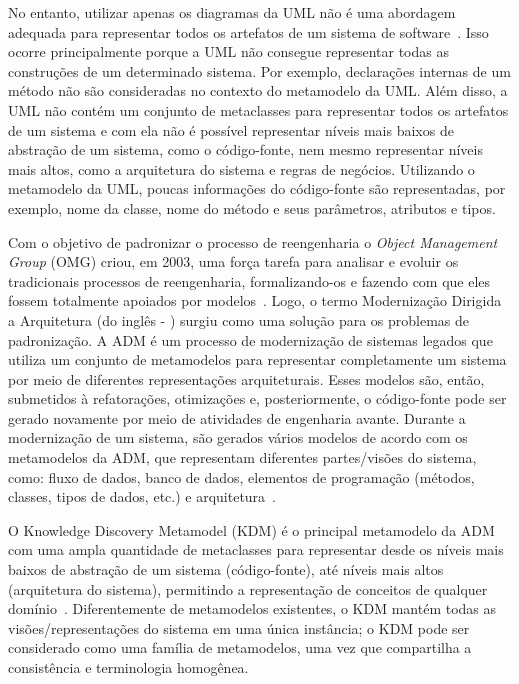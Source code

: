 No entanto, utilizar apenas os diagramas da UML não é uma abordagem adequada para representar todos os artefatos de um sistema de software~\cite{Gorp, KolahdouzRahimi20145, revisao_sistematica_uml_refactoring}. Isso ocorre principalmente porque a UML não consegue representar todas as construções de um determinado sistema. Por exemplo, declarações internas de um método não são consideradas no contexto do metamodelo da UML. Além disso, a UML não contém um conjunto de metaclasses para representar todos os artefatos de um sistema e com ela não é possível representar níveis mais baixos de abstração de um sistema, como o código-fonte, nem mesmo representar níveis mais altos, como a arquitetura do sistema e regras de negócios. Utilizando o metamodelo da UML, poucas informações do código-fonte são representadas, por exemplo, nome da classe, nome do método e seus parâmetros, atributos e tipos.  

Com o objetivo de padronizar o processo de reengenharia o \textit{Object Management Group} (OMG) criou, em 2003, uma força tarefa para analisar e evoluir os tradicionais processos de reengenharia, formalizando-os e fazendo com que eles fossem totalmente apoiados por modelos~\cite{ADM:OMG}. Logo, o termo Modernização Dirigida a Arquitetura (do inglês - ) surgiu como uma solução para os problemas de padronização. A ADM é um processo de modernização de sistemas legados que utiliza um conjunto de metamodelos para representar completamente um sistema por meio de diferentes representações arquiteturais. Esses modelos são, então, submetidos à refatorações, otimizações e, posteriormente, o código-fonte pode ser gerado novamente por meio de atividades de engenharia avante. Durante a modernização de um sistema, são gerados vários modelos de acordo com os metamodelos da ADM, que representam diferentes partes/visões do sistema, como: fluxo de dados, banco de dados, elementos de programação (métodos, classes, tipos de dados, etc.) e arquitetura~\cite{PerezCastillo20121370}.

O Knowledge Discovery Metamodel (KDM) é o principal metamodelo da ADM com uma ampla quantidade de metaclasses para representar desde os níveis mais baixos de abstração de um sistema (código-fonte), até níveis mais altos (arquitetura do sistema), permitindo a representação de conceitos de qualquer domínio~\cite{KDM:specification,KDM:ISO}. Diferentemente de metamodelos existentes, o KDM mantém todas as visões/representações do sistema em uma única instância; o KDM pode ser considerado como uma família de metamodelos, uma vez que compartilha a consistência e terminologia homogênea. 

